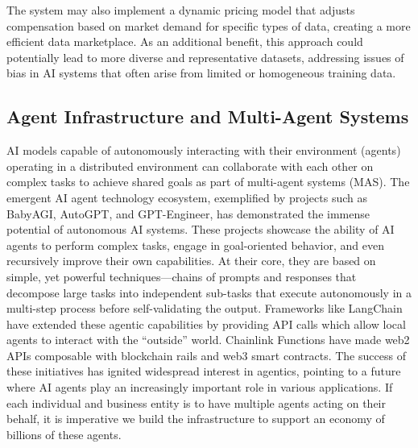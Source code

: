 \documentclass[conference]{IEEEtran}
\begin{document}
The system may also implement a dynamic pricing model that adjusts compensation based on market demand for specific types of data, creating a more efficient data marketplace. As an additional benefit, this approach could potentially lead to more diverse and representative datasets, addressing issues of bias in AI systems that often arise from limited or homogeneous training data.

\subsection{Agent Infrastructure and Multi-Agent Systems}

AI models capable of autonomously interacting with their environment (agents) operating in a distributed environment can collaborate with each other on complex tasks to achieve shared goals as part of multi-agent systems (MAS). The emergent AI agent technology ecosystem, exemplified by projects such as BabyAGI\cite{babyagi}, AutoGPT\cite{autogpt}, and GPT-Engineer\cite{gpteng}, has demonstrated the immense potential of autonomous AI systems. These projects showcase the ability of AI agents to perform complex tasks, engage in goal-oriented behavior, and even recursively improve their own capabilities. At their core, they are based on simple, yet powerful techniques—chains of prompts and responses that decompose large tasks into independent sub-tasks that execute autonomously in a multi-step process before self-validating the output. Frameworks like LangChain\cite{langchain} have extended these agentic capabilities by providing API calls which allow local agents to interact with the ``outside'' world. Chainlink Functions\cite{chainlink} have made web2 APIs composable with blockchain rails and web3 smart contracts. The success of these initiatives has ignited widespread interest in agentics, pointing to a future where AI agents play an increasingly important role in various applications. If each individual and business entity is to have multiple agents acting on their behalf, it is imperative we build the infrastructure to support an economy of billions of these agents. 
\end{document}
